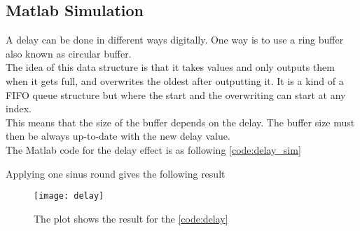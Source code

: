 \subsection{Matlab Simulation}

A delay can be done in different ways digitally. One way is to use a ring buffer also known as circular buffer. \\
The idea of this data structure is that it takes values and only outputs them when it gets full, and overwrites the oldest after outputting it. It is a kind of a FIFO queue structure but where the start and the overwriting can start at any index. \\
This means that the size of the buffer depends on the delay.  The buffer size must then be always up-to-date with the new delay value. \\ 

The Matlab code for the delay effect is as following \autoref{code:delay_sim}

\label{code:delay_sim}


Applying one sinus round gives the following result

\begin{figure}[htbp]
	\centering
	\texttt{[image: delay]}
	\caption{The plot shows the result for the \autoref{code:delay}}
	\label{fig:delay_plot}
\end{figure}